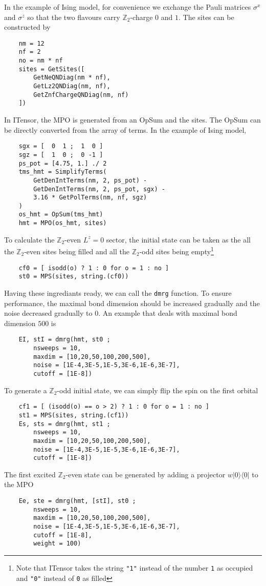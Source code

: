 \documentclass{timesjhep}
\begin{document}
In the example of Ising model, for convenience we exchange the Pauli matrices $\sigma^x$ and $\sigma^z$ so that the two flavours carry $\mathbb{Z}_2$-charge $0$ and $1$. The sites can be constructed by 
\begin{lstlisting}
    nm = 12
    nf = 2
    no = nm * nf
    sites = GetSites([
        GetNeQNDiag(nm * nf), 
        GetLz2QNDiag(nm, nf),
        GetZnfChargeQNDiag(nm, nf)
    ])
\end{lstlisting}

In ITensor, the MPO is generated from an OpSum and the sites. The OpSum can be directly converted from the array of terms. In the example of Ising model, 
\begin{lstlisting}
    sgx = [  0  1 ;  1  0 ]
    sgz = [  1  0 ;  0 -1 ]
    ps_pot = [4.75, 1.] ./ 2
    tms_hmt = SimplifyTerms(
        GetDenIntTerms(nm, 2, ps_pot) - 
        GetDenIntTerms(nm, 2, ps_pot, sgx) - 
        3.16 * GetPolTerms(nm, nf, sgz)
    )
    os_hmt = OpSum(tms_hmt)
    hmt = MPO(os_hmt, sites)
\end{lstlisting}

To calculate the $\mathbb{Z}_2$-even $L^z=0$ sector, the initial state can be taken as the all the $\mathbb{Z}_2$-even sites being filled and all the $\mathbb{Z}_2$-odd sites being empty\footnote{Note that ITensor takes the string \lstinline|"1"| instead of the number \lstinline|1| as occupied and \lstinline|"0"| instead of \lstinline|0| as filled}
\begin{lstlisting}
    cf0 = [ isodd(o) ? 1 : 0 for o = 1 : no ]
    st0 = MPS(sites, string.(cf0))
\end{lstlisting}

Having these ingrediants ready, we can call the \lstinline|dmrg| function. To ensure performance, the maximal bond dimension should be increased gradually and the noise decreased gradually to 0. An example that deals with maximal bond dimension $500$ is 
\begin{lstlisting}
    EI, stI = dmrg(hmt, st0 ; 
        nsweeps = 10, 
        maxdim = [10,20,50,100,200,500], 
        noise = [1E-4,3E-5,1E-5,3E-6,1E-6,3E-7], 
        cutoff = [1E-8])
\end{lstlisting}
To generate a $\mathbb{Z}_2$-odd initial state, we can simply flip the spin on the first orbital
\begin{lstlisting}
    cf1 = [ (isodd(o) == o > 2) ? 1 : 0 for o = 1 : no ]
    st1 = MPS(sites, string.(cf1))
    Es, sts = dmrg(hmt, st1 ; 
        nsweeps = 10, 
        maxdim = [10,20,50,100,200,500], 
        noise = [1E-4,3E-5,1E-5,3E-6,1E-6,3E-7], 
        cutoff = [1E-8])
\end{lstlisting}
The first excited $\mathbb{Z}_2$-even state can be generated by adding a projector $w|0\rangle\langle0|$ to the MPO 
\begin{lstlisting}
    Ee, ste = dmrg(hmt, [stI], st0 ; 
        nsweeps = 10, 
        maxdim = [10,20,50,100,200,500], 
        noise = [1E-4,3E-5,1E-5,3E-6,1E-6,3E-7], 
        cutoff = [1E-8], 
        weight = 100)
\end{lstlisting}
\end{document}
